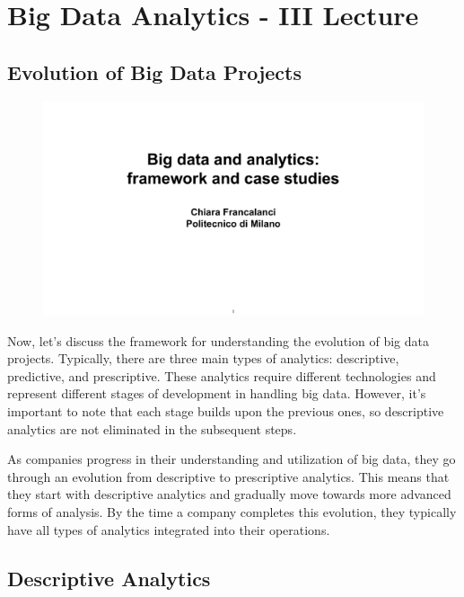 \section{Big Data Analytics - III Lecture}

\subsection{Evolution of Big Data Projects}

\begin{figure}[!h]
  \centering
  \includegraphics[page=38, trim = 3.5cm 1cm 4cm 3.5cm, clip, width=\imagewidth]{images/06 - BIG_DATA.pdf}
\end{figure}

Now, let's discuss the framework for
understanding the evolution of big data projects. Typically, there are
three main types of analytics: descriptive, predictive, and
prescriptive. These analytics require different technologies and
represent different stages of development in handling big data. However,
it's important to note that each stage builds upon the previous ones, so
descriptive analytics are not eliminated in the subsequent steps.

As companies progress in their understanding and utilization of big
data, they go through an evolution from descriptive to prescriptive
analytics. This means that they start with descriptive analytics and
gradually move towards more advanced forms of analysis. By the time a
company completes this evolution, they typically have all types of
analytics integrated into their operations.

\subsection{Descriptive Analytics}

